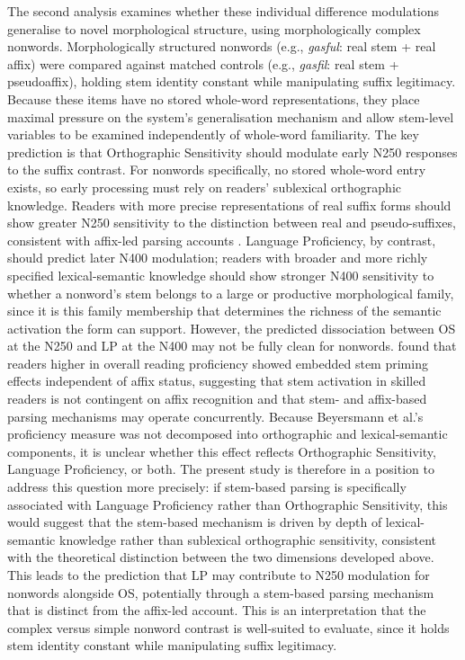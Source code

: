 \documentclass[utf8]{FrontiersinHarvard} %
\begin{document}
	The second analysis examines whether these individual difference modulations generalise to novel morphological structure, using morphologically complex nonwords. Morphologically structured nonwords (e.g., \textit{gasful}: real stem + real affix) were compared against matched controls (e.g., \textit{gasfil}: real stem + pseudoaffix), holding stem identity constant while manipulating suffix legitimacy. Because these items have no stored whole-word representations, they place maximal pressure on the system's generalisation mechanism and allow stem-level variables to be examined independently of whole-word familiarity. The key prediction is that Orthographic Sensitivity should modulate early N250 responses to the suffix contrast. For nonwords specifically, no stored whole-word entry exists, so early processing must rely on readers' sublexical orthographic knowledge. Readers with more precise representations of real suffix forms should show greater N250 sensitivity to the distinction between real and pseudo-suffixes, consistent with affix-led parsing accounts \citep{taft_lexical_1975, rastleMorphologicalDecompositionBased2008}. Language Proficiency, by contrast, should predict later N400 modulation; readers with broader and more richly specified lexical-semantic knowledge should show stronger N400 sensitivity to whether a nonword's stem belongs to a large or productive morphological family, since it is this family membership that determines the richness of the semantic activation the form can support. However, the predicted dissociation between OS at the N250 and LP at the N400 may not be fully clean for nonwords. \citet{beyersmannEmbeddedStemPriming2016} found that readers higher in overall reading proficiency showed embedded stem priming effects independent of affix status, suggesting that stem activation in skilled readers is not contingent on affix recognition and that stem- and affix-based parsing mechanisms may operate concurrently. Because Beyersmann et al.'s proficiency measure was not decomposed into orthographic and lexical-semantic components, it is unclear whether this effect reflects Orthographic Sensitivity, Language Proficiency, or both. The present study is therefore in a position to address this question more precisely: if stem-based parsing is specifically associated with Language Proficiency rather than Orthographic Sensitivity, this would suggest that the stem-based mechanism is driven by depth of lexical-semantic knowledge rather than sublexical orthographic sensitivity, consistent with the theoretical distinction between the two dimensions developed above. This leads to the prediction that LP may contribute to N250 modulation for nonwords alongside OS, potentially through a stem-based parsing mechanism that is distinct from the affix-led account. This is an interpretation that the complex versus simple nonword contrast is well-suited to evaluate, since it holds stem identity constant while manipulating suffix legitimacy.
	
\end{document}
